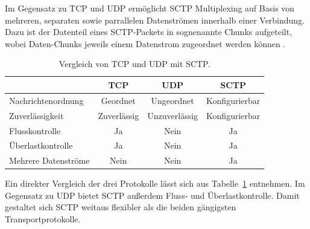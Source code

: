 \vspace{11pt}

Im Gegensatz zu \acs{TCP} und \acs{UDP} ermöglicht \acs{SCTP} Multiplexing auf Basis von mehreren, separaten sowie parrallelen Datenströmen innerhalb einer Verbindung. Dazu ist der Datenteil eines \acs{SCTP}-Packets in sognenannte \glqq{}Chunks\grqq{}  aufgeteilt, wobei Daten-Chunks jeweils einem Datenstrom zugeordnet werden können \cite{sctpRFC}.\par

\begin{table}[ht]
\centering
\begin{tabular}[t]{lccc}
\toprule
&TCP&UDP&SCTP\\
\midrule
Nachrichtenordnung&Geordnet&Ungeordnet&Konfigurierbar\\
Zuverlässigkeit&Zuverlässig&Unzuverlässig&Konfigurierbar\\
Flusskontrolle&Ja&Nein&Ja\\
Überlastkontrolle &Ja&Nein&Ja\\
Mehrere Datenströme&Nein&Nein&Ja\\
\bottomrule
\end{tabular}
\caption{Vergleich von \acs{TCP} und \acs{UDP} mit \acs{SCTP}.}
\label{table:vergleichNetzwerkProtokolle}
\end{table}

Ein direkter Vergleich der drei Protokolle lässt sich aus Tabelle~\ref{table:vergleichNetzwerkProtokolle} entnehmen. Im Gegensatz zu \acs{UDP} bietet \acs{SCTP} außerdem Fluss- und Überlastkontrolle. Damit gestaltet sich \acs{SCTP} weitaus flexibler als die beiden gängigsten Transportprotokolle.\par




